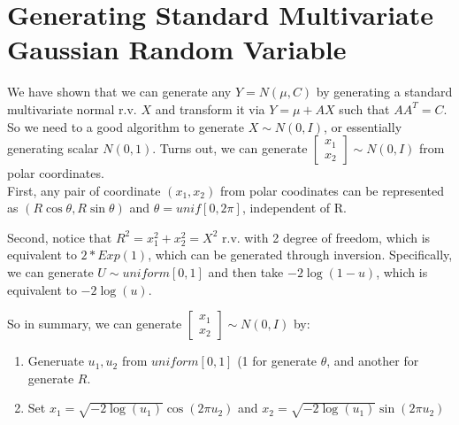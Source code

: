 \section{Generating Standard Multivariate Gaussian Random Variable} 
We have shown that we can generate any $Y=N(\mu, C)$ by generating a standard multivariate normal r.v.  $X$ and transform it via $Y = \mu + AX$ such that $AA^T =C$. So we need to a good algorithm to generate $X\sim N(0, I)$, or essentially generating scalar $N(0,1)$. Turns out, we can generate $\begin{bmatrix} x_1 \\ x_2\end{bmatrix}\sim N(0,I)$ from polar coordinates. \\

First, any pair of coordinate $(x_1, x_2)$ from polar coodinates can be represented as $(R \cos \theta, R \sin \theta)$ and $\theta = unif[0, 2\pi]$, independent of R. 

Second, notice that $R^2 = x_1^2 + x_2^2 = X^2$ r.v. with 2 degree of freedom, which is equivalent to $2 * Exp(1)$, which can be generated through inversion. Specifically, we can generate $U\sim uniform[0,1]$ and then take $-2 \log(1-u)$, which is equivalent to $-2 \log(u)$. 

So in summary, we can generate $\begin{bmatrix} x_1 \\ x_2\end{bmatrix}\sim N(0,I)$ by: 
    \begin{enumerate}
        \item Generuate $u_1, u_2$ from $uniform[0,1]$ (1 for generate $\theta$, and another for generate $R$. 
        \item Set $x_1 = \sqrt{-2 \log(u_1)} \cos(2\pi u_2)$ and $x_2 = \sqrt{-2 \log(u_1)}\sin(2\pi u_2)$
    \end{enumerate}

